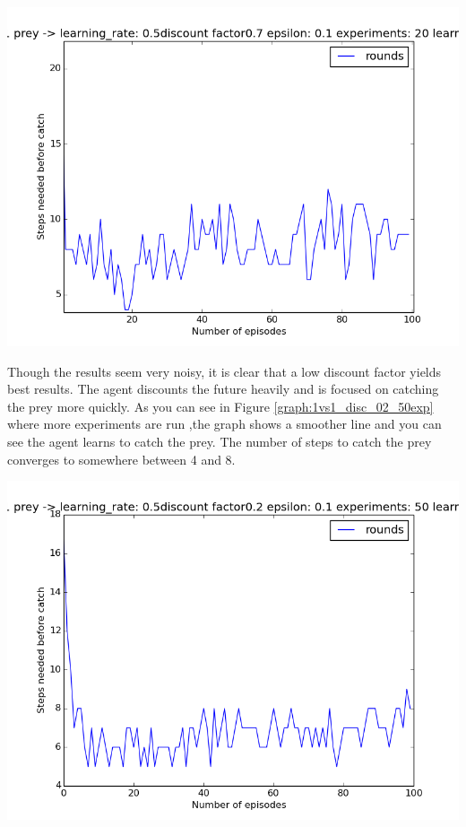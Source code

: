 \begin{center}
	\includegraphics[scale=0.3]{minimax_100rounds_20exp_disc07_alpha05}
	\label{graph:1vs1_disc_07}
\end{center}

Though the results seem very noisy, it is clear that a low discount factor yields best results. The agent discounts the future heavily and is focused on catching the prey more quickly. As you can see in Figure \ref{graph:1vs1_disc_02_50exp} where more experiments are run ,the graph shows a smoother line and you can see the agent learns to catch the prey. The number of steps to catch the prey converges to somewhere between 4 and 8.  

\begin{center}
	\includegraphics[scale=0.3]{minimax_gridsize5_100round_50exp_disc02_learningrate_05}
	\label{graph:1vs1_disc_02_50exp}
\end{center}

